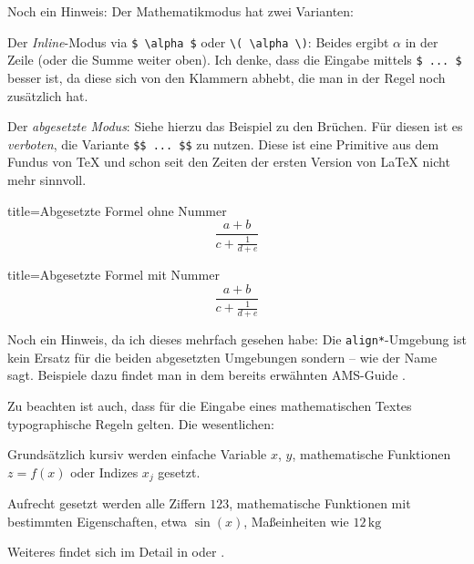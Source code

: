 Noch ein Hinweis: Der Mathematikmodus hat zwei Varianten:
%
\begin{myitemize}
	
	\item
	Der \emph{Inline}-Modus via \verb!$ \alpha $! oder \verb|\( \alpha \)|: Beides ergibt \( \alpha \) in der Zeile (oder die Summe weiter oben).
	Ich denke, dass die Eingabe  mittels \verb|$ ... $| besser ist, da diese sich von den Klammern abhebt, die man in der Regel noch zusätzlich hat.
	
	\item
	Der \emph{abgesetzte Modus}: Siehe hierzu das Beispiel zu den Brüchen.
	Für diesen ist es \emph{verboten}, die Variante \verb!$$ ... $$! zu nutzen.
	Diese ist eine \sog Primitive aus dem Fundus von \TeX{} und schon seit den Zeiten der ersten Version von \LaTeX{} nicht mehr sinnvoll.
		
	\begin{tcblisting}{title=Abgesetzte Formel ohne Nummer}
		\[
			\frac{a+b}{c + \frac{1}{d+e}}
		\]
	\end{tcblisting}
		\begin{tcblisting}{title=Abgesetzte Formel mit Nummer}
		\begin{equation}\label{eq:gleichung}
			\frac{a+b}{c + \frac{1}{d+e}}
		\end{equation}
	\end{tcblisting}
\end{myitemize}
Noch ein Hinweis, da ich dieses mehrfach gesehen habe: Die \texttt{align*}-Umgebung ist kein Ersatz für die beiden \og abgesetzten Umgebungen sondern -- wie der Name sagt.
Beispiele dazu findet man in dem bereits erwähnten AMS-Guide \cite{short-math-guide}.

Zu beachten ist auch, dass für die Eingabe eines mathematischen Textes typographische Regeln gelten.
Die wesentlichen:

\begin{myenumerate}
	\item
	Grundsätzlich kursiv werden einfache Variable $ x $, $ y $, mathematische Funktionen $ z = f(x) $ oder Indizes $ x_{ j } $ gesetzt.
	
	\item
	Aufrecht gesetzt werden alle Ziffern $ 1 23 $, mathematische Funktionen mit bestimmten Eigenschaften, etwa $  \sin(x) $, Maßeinheiten wie $ 12 \, \mathrm{kg} $ \etc

\end{myenumerate}
%
Weiteres findet sich im Detail in \textcite{voss:2012b} oder \textcite{nadler:formelsatz}.

